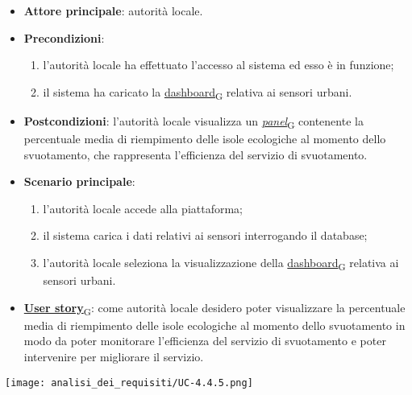 \newpage
{}
\begin{itemize}
	\item \textbf{Attore principale}: autorità locale.
	\item \textbf{Precondizioni}:
	      \begin{enumerate}
		      \item l'autorità locale ha effettuato l'accesso al sistema ed esso è in funzione;
		      \item il sistema ha caricato la \href{https://7last.github.io/docs/pb/documentazione-interna/glossario\#dashboard}{dashboard\textsubscript{G}} relativa ai sensori urbani.
	      \end{enumerate}
	\item \textbf{Postcondizioni}: l'autorità locale visualizza un \href{https://7last.github.io/docs/pb/documentazione-interna/glossario\#panel}{\textit{panel}\textsubscript{G}} contenente la percentuale media di riempimento delle isole ecologiche al momento dello svuotamento,
	      che rappresenta l'efficienza del servizio di svuotamento.
	\item \textbf{Scenario principale}:
	      \begin{enumerate}
		      \item l'autorità locale accede alla piattaforma;
		      \item il sistema carica i dati relativi ai sensori interrogando il database;
		      \item l'autorità locale seleziona la visualizzazione della \href{https://7last.github.io/docs/pb/documentazione-interna/glossario\#dashboard}{dashboard\textsubscript{G}} relativa ai sensori urbani.
	      \end{enumerate}
	\item \href{https://7last.github.io/docs/pb/documentazione-interna/glossario\#user-story}{\textbf{User story}\textsubscript{G}}:
	      come autorità locale desidero poter visualizzare la percentuale media di riempimento delle isole ecologiche al momento dello svuotamento in modo da poter monitorare
	      l'efficienza del servizio di svuotamento e poter intervenire per migliorare il servizio.
\end{itemize}
\begin{center}
	\texttt{[image: analisi\_dei\_requisiti/UC-4.4.5.png]}
\end{center}

